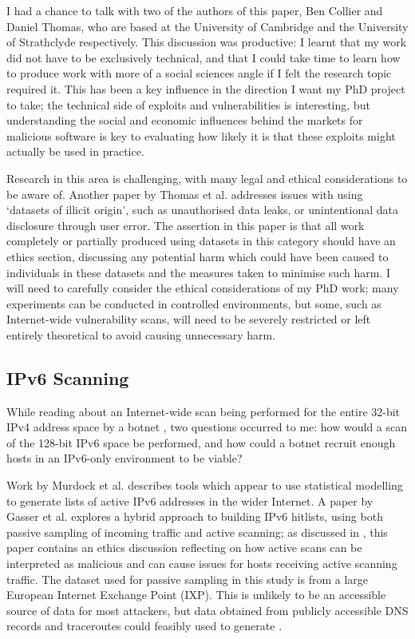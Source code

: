 \documentclass[10pt,sigconf]{acmart}
\begin{document}
I had a chance to talk with two of the authors of this paper, Ben Collier and Daniel Thomas, who are based at the University of Cambridge and the University of Strathclyde respectively.
This discussion was productive:
I learnt that my work did not have to be exclusively technical, and that I could take time to learn how to produce work with more of a social sciences angle if I felt the research topic required it.
This has been a key influence in the direction I want my PhD project to take;
the technical side of exploits and vulnerabilities is interesting, but understanding the social and economic influences behind the markets for malicious software is key to evaluating how likely it is that these exploits might actually be used in practice.

Research in this area is challenging, with many legal and ethical considerations to be aware of.
Another paper by Thomas et al. \cite{thomas2017} addresses issues with using `datasets of illicit origin', such as unauthorised data leaks, or unintentional data disclosure through user error.
The assertion in this paper is that all work completely or partially produced using datasets in this category should have an ethics section, discussing any potential harm which could have been caused to individuals in these datasets and the measures taken to minimise such harm.
I will need to carefully consider the ethical considerations of my PhD work;
many experiments can be conducted in controlled environments, but some, such as Internet-wide vulnerability scans, will need to be severely restricted or left entirely theoretical to avoid causing unnecessary harm.

\subsection{IPv6 Scanning}
\label{ipv6-reading}
While reading about an Internet-wide scan being performed for the entire 32-bit IPv4 address space by a botnet \cite{dainotte2014}, two questions occurred to me:
how would a scan of the 128-bit IPv6 space be performed, and how could a botnet recruit enough hosts in an IPv6-only environment to be viable?

Work by Murdock et al. \cite{murdock2017} describes tools which appear to use statistical modelling to generate lists of active IPv6 addresses in the wider Internet.
A paper by Gasser et al. \cite{gasser2016} explores a hybrid approach to building IPv6 hitlists, using both passive sampling of incoming traffic and active scanning;
as discussed in \cite{thomas2017}, this paper contains an ethics discussion reflecting on how active scans can be interpreted as malicious and can cause issues for hosts receiving active scanning traffic.
The dataset used for passive sampling in this study is from a large European Internet Exchange Point (IXP).
This is unlikely to be an accessible source of data for most attackers, but data obtained from publicly accessible DNS records and traceroutes could feasibly used to generate .
\end{document}

